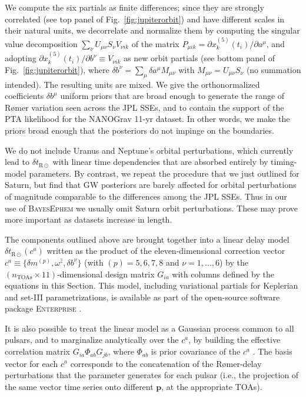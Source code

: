 \documentclass{aastex63}
\begin{document}
\begin{itemize}
We compute the six partials as finite differences; since they are strongly correlated (see top panel of Fig.\ \ref{fig:jupiterorbit}) and have different scales in their natural units, we decorrelate and normalize them by computing the singular value decomposition $\sum_\nu U_{\mu\nu} S_\nu V_{\nu i k}$ of the matrix $P_{\mu i k} = \partial x^{(5)}_k(t_i)/\partial a^\mu$, and adopting $\partial x^{(5)}_k(t_i)/\partial b^\nu \equiv V_{\nu i k}$ as new orbit partials (see bottom panel of Fig.\ \ref{fig:jupiterorbit}), where $\delta b^\nu = \sum_\mu \delta a^\mu M_{\mu \nu}$ with $M_{\mu \nu} = U_{\mu\nu} S_\nu$ (no summation intended). The resulting units are mixed. We give the orthonormalized coefficients $\delta b^\mu$ uniform priors that are broad enough to generate the range of R{\o}mer variation seen across the JPL SSEs, and to contain the support of the PTA likelihood for the NANOGrav 11-yr dataset. In other words, we make the priors broad enough that the posteriors do not impinge on the boundaries.

We do not include Uranus and Neptune's orbital perturbations, which currently lead to $\delta t_{\mathrm{R\odot}}$ with linear time dependencies that are absorbed entirely by timing-model parameters. By contrast, we repeat the procedure that we just outlined for Saturn, but find that GW posteriors are barely affected for orbital perturbations of magnitude comparable to the differences among the JPL SSEs. Thus in our use of \textsc{BayesEphem} we usually omit Saturn orbit perturbations. These may prove more important as datasets increase in length.
\end{itemize}

The components outlined above are brought together into a linear delay model $\delta t_{\mathrm{R}\odot}(c^a)$ written as the product of the eleven-dimensional correction vector $c^a \equiv \{\delta m^{(p)}, \omega^{\hat{z}}, \delta b^\nu\}$ (with $(p) = 5,6,7,8$ and $\nu = 1, \ldots, 6$) by the $(n_\mathrm{TOAs} \times 11)$-dimensional design matrix $G_{i a}$ with columns defined by the equations in this Section. This model, including variational partials for Keplerian and set-III parametrizations, is available as part of the open-source software package \textsc{Enterprise} \citep{2019ascl.soft12015E}.

It is also possible to treat the linear model as a Gaussian process common to all pulsars, and to marginalize analytically over the $c^a$, by building the effective correlation matrix $G_{i a} \Phi_{ab} G_{j b}$, where $\Phi_{ab}$ is prior covariance of the $c^a$ \citep{vhv14}. The basis vector for each $c^a$ corresponds to the concatenation of the R{\o}mer-delay perturbations that the parameter generates for each pulsar (i.e., the projection of the same vector time series onto different $\mathbf{p}$, at the appropriate TOAs).
\end{document}

